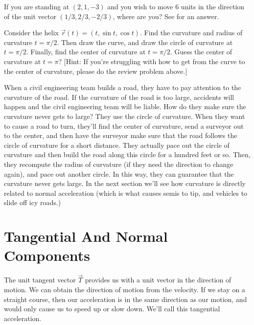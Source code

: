 \begin{review*}
 If you are standing at $(2,1,-3)$ and you wish to move 6 units in the direction of the unit vector $(1/3, 2/3, -2/3)$, where are you? See  for an answer.	
\end{review*}

\begin{problem}%
 Consider the helix $\vec r(t)=(t,\sin t,\cos t)$. Find the curvature and radius of curvature $t=\pi/2$. Then draw the curve, and draw the circle of curvature at $t=\pi/2$. Finally, find the center of curvature at $t=\pi/2$. Guess the center of curvature at $t=\pi$? [Hint: If you're struggling with how to get from the curve to the center of curvature, please do the review problem above.]
\end{problem}

When a civil engineering team builds a road, they have to pay attention to the curvature of the road.  If the curvature of the road is too large, accidents will happen and the civil engineering team will be liable. How do they make sure the curvature never gets to large?  They use the circle of curvature. When they want to cause a road to turn, they'll find the center of curvature, send a surveyor out to the center, and then have the surveyor make sure that the road follows the circle of curvature for a short distance. They actually pace out the circle of curvature and then build the road along this circle for a hundred feet or so.  Then, they recompute the radius of curvature (if they need the direction to change again), and pace out another circle.  In this way, they can guarantee that the curvature never gets large. In the next section we'll see how curvature is directly related to normal acceleration (which is what causes semis to tip, and vehicles to slide off icy roads.)





\section{Tangential And Normal Components}

The unit tangent vector $\vec T$ provides us with a unit vector in the direction of motion. We can obtain the direction of motion from the velocity. If we stay on a straight course, then our acceleration is in the same direction as our motion, and would only cause us to speed up or slow down. We'll call this tangential acceleration.

